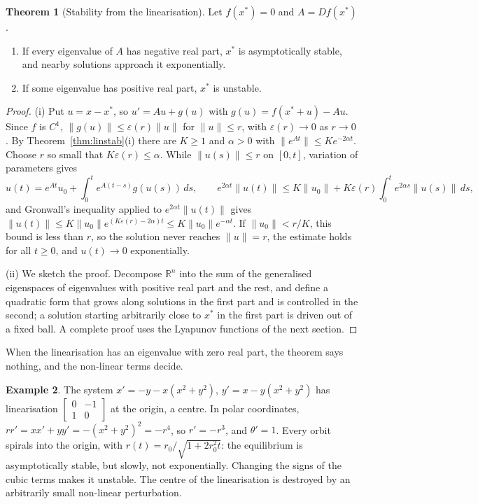 \documentclass[11pt,a4paper]{article}
\numberwithin{equation}{section}
\theoremstyle{definition}
\newtheorem{thm}{Theorem}[subsection]
\newtheorem{exa}[thm]{Example}
\begin{document}
\begin{thm}[Stability from the linearisation]
\label{thm:linstabnl}
Let $f(x^*) = 0$ and $A = Df(x^*)$.
\begin{enumerate}[label=(\roman*)]
\item If every eigenvalue of $A$ has negative real part, $x^*$ is asymptotically stable, and nearby solutions approach it exponentially.
\item If some eigenvalue has positive real part, $x^*$ is unstable.
\end{enumerate}
\end{thm}

\begin{proof}
(i) Put $u = x - x^*$, so $u' = Au + g(u)$ with $g(u) = f(x^* + u) - Au$. Since $f$ is $C^1$, $\|g(u)\| \leq \varepsilon(r)\|u\|$ for $\|u\| \leq r$, with $\varepsilon(r) \to 0$ as $r \to 0$. By Theorem~\ref{thm:linstab}(i) there are
$K \geq 1$ and $\alpha > 0$ with $\|e^{At}\| \leq Ke^{-2\alpha t}$. Choose $r$ so small that $K\varepsilon(r) \leq \alpha$. While $\|u(s)\| \leq r$ on $[0, t]$, variation of parameters gives
\[
u(t) = e^{At}u_0 + \int_0^te^{A(t - s)}g(u(s))\,ds, \qquad e^{2\alpha t}\|u(t)\| \leq K\|u_0\| + K\varepsilon(r)\int_0^te^{2\alpha s}\|u(s)\|\,ds ,
\]
and Gronwall's inequality applied to $e^{2\alpha t}\|u(t)\|$ gives $\|u(t)\| \leq K\|u_0\|e^{(K\varepsilon(r) - 2\alpha)t} \leq K\|u_0\|e^{-\alpha t}$. If $\|u_0\| < r/K$, this bound is less than $r$, so the solution never reaches
$\|u\| = r$, the estimate holds for all $t \geq 0$, and $u(t) \to 0$ exponentially.

(ii) We sketch the proof. Decompose $\mathbb R^n$ into the sum of the generalised eigenspaces of eigenvalues with positive real part and the rest, and define a quadratic form that grows along
solutions in the first part and is controlled in the second; a solution starting arbitrarily close to $x^*$ in the first part is driven out of a fixed ball. A complete proof uses the
Lyapunov functions of the next section.
\end{proof}

When the linearisation has an eigenvalue with zero real part, the theorem says nothing, and the non-linear terms decide.

\begin{exa}
\label{ex:fakecentre}
The system $x' = -y - x(x^2 + y^2)$, $y' = x - y(x^2 + y^2)$ has linearisation $\begin{bmatrix} 0 & -1\\ 1 & 0\end{bmatrix}$ at the origin, a centre. In polar coordinates, $rr' = xx' + yy' = -(x^2 + y^2)^2 = -r^4$,
so $r' = -r^3$, and $\theta' = 1$. Every orbit spirals into the origin, with $r(t) = r_0/\sqrt{1 + 2r_0^2t}$: the equilibrium is asymptotically stable, but slowly, not exponentially. Changing the signs of the cubic
terms makes it unstable. The centre of the linearisation is destroyed by an arbitrarily small non-linear perturbation.
\end{exa}
\end{document}
